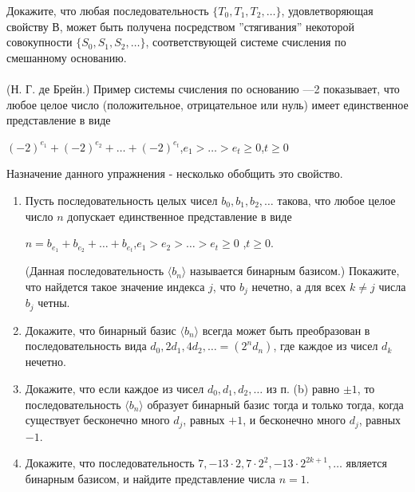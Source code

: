 Докажите, что любая последовательность $\lbrace T_{0}, T_{1}, T_{2},  \ldots \rbrace$, удовлетворяющая свойству В, может быть получена посредством ''стягивания'' некоторой совокупности $\lbrace S_{0}, S_{1}, S_{2},  \ldots \rbrace$, соответствующей системе счисления по смешанному основанию.

\paragraph{} 
(Н. Г. де Брейн.) Пример системы счисления по основанию —2 показывает, что любое целое число (положительное, отрицательное или нуль) имеет единственное представление в виде
\begin{center}
$(-2)^{e_{1}} + (-2)^{e_{2}} +  \ldots  + (-2)^{e_{t}}$,\tab $e_{1} >  \ldots  > e_{t} \geq 0$,\tab $t \geq 0$
\end{center}
Назначение данного упражнения - несколько обобщить это свойство.

\begin{enumerate}[label=\alph*)]
\item Пусть последовательность целых чисел $ b_{0}, b_{1}, b_{2},  \ldots $ такова, что любое целое число $ n $ допускает единственное представление в виде
\begin{center}
$ n = b_{e_{1}} + b_{e_{2}} +  \ldots  + b_{e_{t}} $,\tab $ e_{1} > e_{2} >  \ldots  > e_{t} \geq 0 $ ,\tab $ t \geq 0  $. 
\end{center}

(Данная последовательность $\langle b_{n}\rangle $  называется бинарным базисом.) Покажите, что найдется такое значение индекса $j$, что $b_{j}$ нечетно, а для всех $k \neq j$ числа $b_{j}$ четны.

\item Докажите, что бинарный базис $\langle b_{n}\rangle $  всегда может быть преобразован в последовательность вида $d_{0}, 2d_{1}, 4d_{2},  \ldots  = (2^{n}d_{n})$, где каждое из чисел $d_{k}$ нечетно.

\item Докажите, что если каждое из чисел $d_{0}, d_{1}, d_{2},  \ldots $ из п. (b) равно $\pm 1$, то последовательность $\langle b_{n}\rangle $ образует бинарный базис тогда и только тогда, когда существует бесконечно много $d_{j}$, равных $+1$, и бесконечно много $d_{j}$, равных $-1$.

\item Докажите, что последовательность $7, -13 \cdot 2, 7 \cdot 2^{2}, -13 \cdot 2^{2k+1},  \ldots $ является бинарным базисом, и найдите представление числа $n = 1$.
\end{enumerate}

